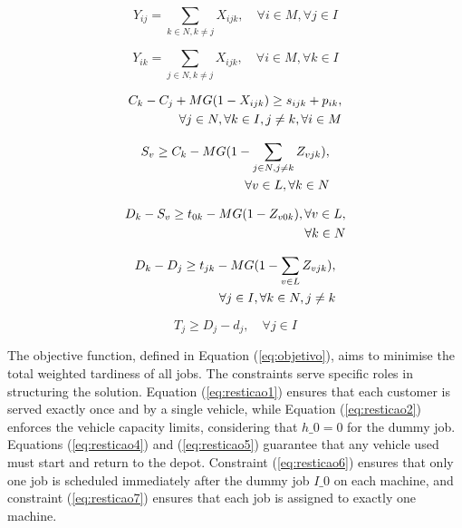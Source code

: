 \documentclass{article}
\begin{document}
\begin{equation}
\label{eq:resticao8}
    Y_{ij} =  \sum\limits_{k \in N, k \neq j} X_{ijk}, \quad \forall i \in M,  \forall j \in I
\end{equation}

\begin{equation}
 \label{eq:resticao9}
    Y_{ik} =  \sum\limits_{j \in N, k \neq j} X_{ijk}, \quad \forall i \in M,  \forall k \in I
\end{equation}

\begin{align}
\label{eq:resticao10}
    C_k - C_j + MG(1 - X_{ijk}) \geq s_{ijk} + p_{ik},\notag\\
    \quad \forall j \in N,  \forall k \in I, j \neq k, \forall i \in M 
\end{align}

\begin{align}
\label{eq:resticao12}
    S_v \geq C_k - MG(1 - \sum\limits_{j\in N, j\neq k} Z_{vjk}), \notag\\
    \quad  \forall v \in L, \forall k \in N
\end{align}

\begin{align}
\label{eq:resticao13}
    D_k - S_v \geq t_{0k} - MG(1 - Z_{v0k}), \forall v \in L,  \notag\\
    \qquad \forall k \in N 
\end{align}

\begin{align}
\label{eq:resticao14}
    D_k - D_j \geq t_{jk} - MG(1 - \sum\limits_{v\in L} Z_{vjk}), \notag\\  
    \quad \forall j \in I, \forall k \in N,  j \neq k 
\end{align}

\begin{equation}
\label{eq:resticao15}
    T_j \geq D_{j} - d_j ,  \quad \forall j \in I 
\end{equation}




The objective function, defined in Equation (\ref{eq:objetivo}), aims to minimise the total weighted tardiness of all jobs. The constraints serve specific roles in structuring the solution. Equation (\ref{eq:resticao1}) ensures that each customer is served exactly once and by a single vehicle, while Equation (\ref{eq:resticao2}) enforces the vehicle capacity limits, considering that $h\_0 = 0$ for the dummy job. Equations (\ref{eq:resticao4}) and (\ref{eq:resticao5}) guarantee that any vehicle used must start and return to the depot. Constraint (\ref{eq:resticao6}) ensures that only one job is scheduled immediately after the dummy job $I\_0$ on each machine, and constraint (\ref{eq:resticao7}) ensures that each job is assigned to exactly one machine.
\end{document}
